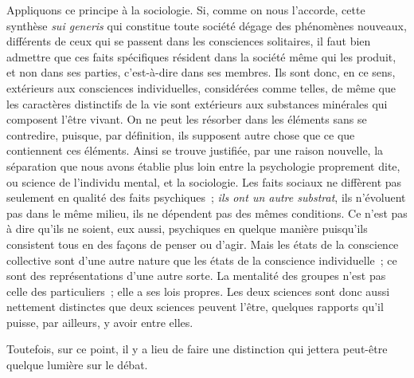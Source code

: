 \documentclass[french,twoside]{book} %
\begin{document}
Appliquons ce principe à la sociologie. Si, comme on nous l’accorde, cette synthèse {\itshape sui generis} qui constitue toute société dégage des phénomènes nouveaux, différents de ceux qui se passent dans les consciences solitaires, il faut bien admettre que ces faits spécifiques résident dans la société même qui les produit, et non dans ses parties, c’est-à-dire dans ses membres. Ils sont donc, en ce sens, extérieurs aux consciences individuelles, considérées comme telles, de même que les caractères distinctifs de la vie sont extérieurs aux substances minérales qui composent l’être vivant. On ne peut les résorber dans les éléments sans se contredire, puisque, par définition, ils supposent autre chose que ce que contiennent ces éléments. Ainsi se trouve justifiée, par une raison nouvelle, la séparation que nous avons établie plus loin entre la psychologie proprement dite, ou science de l’individu mental, et la sociologie. Les faits sociaux ne diffèrent pas seulement en qualité des faits psychiques ; {\itshape ils ont un autre substrat}, ils n’évoluent pas dans le même milieu, ils ne dépendent pas des mêmes conditions. Ce n’est pas à dire qu’ils ne soient, eux aussi, psychiques en quelque manière puisqu’ils consistent tous en des façons de penser ou d’agir. Mais les états de la conscience collective sont d’une autre nature que les états de la conscience individuelle ; ce sont des représentations d’une autre sorte. La mentalité des groupes n’est pas celle des particuliers ; elle a ses lois propres. Les deux sciences sont donc aussi nettement distinctes que deux sciences peuvent l’être, quelques rapports qu’il puisse, par ailleurs, y avoir entre elles.\par
Toutefois, sur ce point, il y a lieu de faire une distinction qui jettera peut-être quelque lumière sur le débat.\par
\end{document}
